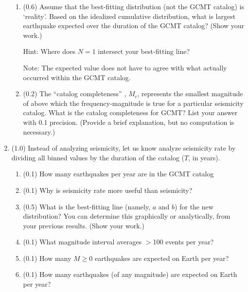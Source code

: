 \documentclass[11pt,titlepage,fleqn]{article}
\begin{document}
\begin{enumerate}
\begin{enumerate}

\item (0.6) Assume that the best-fitting distribution (not the GCMT catalog) is `reality'. Based on the idealized cumulative distribution, what is largest earthquake expected over the duration of the GCMT catalog? (Show your work.)

Hint: Where does $N = 1$ intersect your best-fitting line?

Note: The expected value does not have to agree with what actually occurred within the GCMT catalog.


\item (0.2) The ``catalog completeness'' \citep[\eg][]{WiemerWyss2000}, $M_c$, represents the smallest magnitude of above which the frequency-magnitude is true for a particular seismicity catalog. What is the catalog completeness for GCMT? List your answer with 0.1 precision. (Provide a brief explanation, but no computation is necessary.)

\end{enumerate}


\item (1.0) Instead of analyzing seismicity, let us know analyze seismicity rate by dividing all binned values by the duration of the catalog ($T$, in years).
%
\begin{enumerate}
\item (0.1) How many earthquakes per year are in the GCMT catalog

\item (0.1) Why is seismicity rate more useful than seismicity?

\item (0.5) What is the best-fitting line (namely, $a$ and $b$) for the new distribution?
You can determine this graphically or analytically, from your previous results.
(Show your work.)

\item (0.1) What magnitude interval averages $>$100 events per year?

\item (0.1) How many $M \ge 0$ earthquakes are expected on Earth per year?

\item (0.1) How many earthquakes (of any magnitude) are expected on Earth per year?
\end{enumerate}


\end{enumerate}
\end{document}
